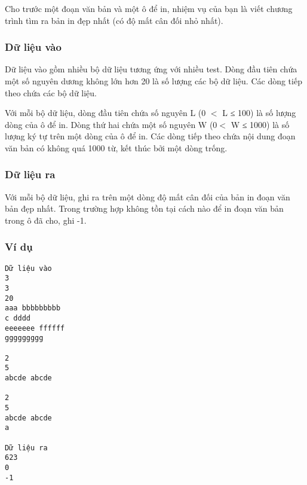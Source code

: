    Cho trước một đoạn văn bản và một ô để in, nhiệm vụ của bạn là viết chương trình tìm ra bản in đẹp nhất (có độ mất cân đối nhỏ nhất).  

\subsubsection{   Dữ liệu vào  }

   Dữ liệu vào gồm nhiều bộ dữ liệu tương ứng với nhiều test. Dòng đầu tiên chứa một số nguyên dương không lớn hơn 20 là số lượng các bộ dữ liệu. Các dòng tiếp theo chứa các bộ dữ liệu.  

   Với mỗi bộ dữ liệu, dòng đầu tiên chứa số nguyên L (0 $<$ L ≤ 100) là số lượng dòng của ô để in. Dòng thứ hai chứa một số nguyên W (0$<$ W ≤ 1000) là số lượng ký tự trên một dòng của ô để in. Các dòng tiếp theo chứa nội dung đoạn văn bản có không quá 1000 từ, kết thúc bởi một dòng trống.  

\subsubsection{   Dữ liệu ra  }

   Với mỗi bộ dữ liệu, ghi ra trên một dòng độ mất cân đối của bản in đoạn văn bản đẹp nhất. Trong trường hợp không tồn tại cách nào để in đoạn văn bản trong ô đã cho, ghi -1.  

\subsubsection{   Ví dụ  }
\begin{verbatim}
Dữ liệu vào
3
3
20
aaa bbbbbbbbb 
c dddd
eeeeeee ffffff
ggggggggg

2
5
abcde abcde

2
5
abcde abcde 
a

Dữ liệu ra
623
0
-1
\end{verbatim}
